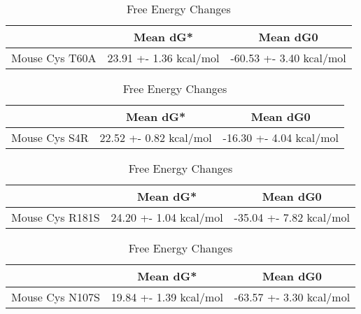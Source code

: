         \begin{table}[ht]
          \centering
          \begin{tabular}{|c|c|c|}
          \hline
            & Mean dG* & Mean dG0 \\
          \hline
Mouse Cys T60A & 23.91 +- 1.36 kcal/mol & -60.53 +- 3.40 kcal/mol \\
          \hline
          \end{tabular}
          \caption{Free Energy Changes}
          \end{table}


          \begin{table}[ht]
            \centering
            \begin{tabular}{|c|c|c|}
            \hline
              & Mean dG* & Mean dG0 \\
            \hline
       Mouse Cys S4R & 22.52 +- 0.82 kcal/mol & -16.30 +- 4.04 kcal/mol \\
            \hline
            \end{tabular}
            \caption{Free Energy Changes}
            \end{table}
            

            \begin{table}[ht]
              \centering
              \begin{tabular}{|c|c|c|}
              \hline
                & Mean dG* & Mean dG0 \\
              \hline
   Mouse Cys R181S & 24.20 +- 1.04 kcal/mol & -35.04 +- 7.82 kcal/mol \\
              \hline
              \end{tabular}
              \caption{Free Energy Changes}
              \end{table}

          \begin{table}[ht]
            \centering
            \begin{tabular}{|c|c|c|}
            \hline
              & Mean dG* & Mean dG0 \\
            \hline
Mouse Cys N107S & 19.84 +- 1.39 kcal/mol & -63.57 +- 3.30 kcal/mol \\
            \hline
            \end{tabular}
            \caption{Free Energy Changes}
            \end{table}

              
          

              

                                        